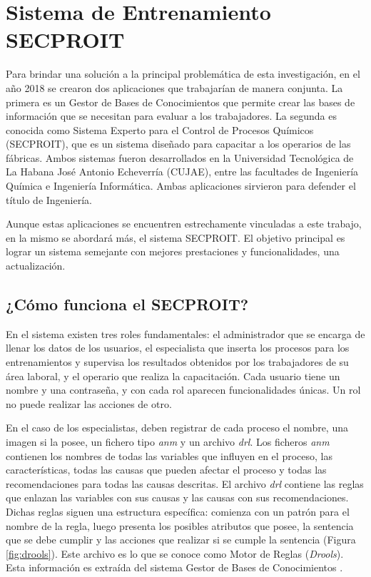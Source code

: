 
\section{Sistema de Entrenamiento SECPROIT}
Para brindar una solución a la principal problemática de esta investigación, en el año 2018 se crearon dos aplicaciones que trabajarían de manera conjunta. La primera es un Gestor de Bases de Conocimientos que permite crear las bases de información que se necesitan para evaluar a los trabajadores. La segunda es conocida como Sistema Experto para el Control de Procesos Químicos (SECPROIT), que es un sistema diseñado para capacitar a los operarios de las fábricas. Ambos sistemas fueron desarrollados en la Universidad Tecnológica de La Habana José Antonio Echeverría (CUJAE), entre las facultades de Ingeniería Química e Ingeniería Informática. Ambas aplicaciones sirvieron para defender el título de Ingeniería.

Aunque estas aplicaciones se encuentren estrechamente vinculadas a este trabajo, en la mismo se abordará más, el sistema SECPROIT. El objetivo principal es lograr un sistema semejante con mejores prestaciones y funcionalidades, una actualización.

\subsection{¿Cómo funciona el SECPROIT?}
En el sistema existen tres roles fundamentales: el administrador que se encarga de llenar los datos de los usuarios, el especialista que inserta los procesos para los entrenamientos y supervisa los resultados obtenidos por los trabajadores de su área laboral, y el operario que realiza la capacitación. Cada usuario tiene un nombre y una contraseña, y con cada rol aparecen funcionalidades únicas. Un rol no puede realizar las acciones de otro.

En el caso de los especialistas, deben registrar de cada proceso el nombre, una imagen si la posee, un fichero tipo \textsl{anm} y un archivo \textsl{drl}. Los ficheros \textsl{anm} contienen los nombres de todas las variables que influyen en el proceso, las características, todas las causas que pueden afectar el proceso y todas las recomendaciones para todas las causas descritas. El archivo \textsl{drl} contiene las reglas que enlazan las variables con sus causas y las causas con sus recomendaciones. Dichas reglas siguen una estructura específica: comienza con un patrón para el nombre de la regla, luego presenta los posibles atributos que posee, la sentencia que se debe cumplir y las acciones que realizar si se cumple la sentencia (Figura \ref{fig:drools}). Este archivo es lo que se conoce como Motor de Reglas (\textsl{Drools}). Esta información es extraída del sistema Gestor de Bases de Conocimientos \cite{anaMailen}.


